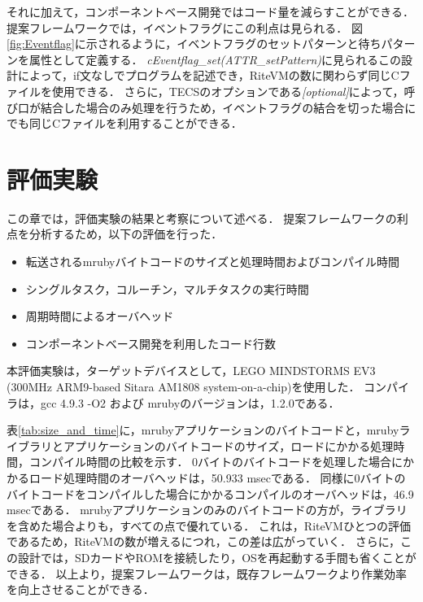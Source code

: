 \documentclass[submit,techrep]{ipsj}
\begin{document}
それに加えて，コンポーネントベース開発ではコード量を減らすことができる．
提案フレームワークでは，イベントフラグにこの利点は見られる．
図\ref{fig:Eventflag}に示されるように，イベントフラグのセットパターンと待ちパターンを属性として定義する．
{\it cEventflag\_set(ATTR\_setPattern)}に見られるこの設計によって，if文なしでプログラムを記述でき，RiteVMの数に関わらず同じCファイルを使用できる．
さらに，TECSのオプションである{\it [optional]}によって，呼び口が結合した場合のみ処理を行うため，イベントフラグの結合を切った場合にでも同じCファイルを利用することができる．

\section{評価実験}
\label{sec:Evaluation}
この章では，評価実験の結果と考察について述べる．
提案フレームワークの利点を分析するため，以下の評価を行った．
\begin{itemize}
    \item 転送されるmrubyバイトコードのサイズと処理時間およびコンパイル時間
    \item シングルタスク，コルーチン，マルチタスクの実行時間
    \item 周期時間によるオーバヘッド
    \item コンポーネントベース開発を利用したコード行数
\end{itemize}

本評価実験は，ターゲットデバイスとして，LEGO MINDSTORMS EV3 (300MHz ARM9-based Sitara AM1808 system-on-a-chip)を使用した．
コンパイラは，gcc 4.9.3 -O2 および mrubyのバージョンは，1.2.0である．

表\ref{tab:size_and_time}に，mrubyアプリケーションのバイトコードと，mrubyライブラリとアプリケーションのバイトコードのサイズ，ロードにかかる処理時間，コンパイル時間の比較を示す．
0バイトのバイトコードを処理した場合にかかるロード処理時間のオーバヘッドは，50.933 msecである．
同様に0バイトのバイトコードをコンパイルした場合にかかるコンパイルのオーバヘッドは，46.9 msecである．
mrubyアプリケーションのみのバイトコードの方が，ライブラリを含めた場合よりも，すべての点で優れている．
これは，RiteVMひとつの評価であるため，RiteVMの数が増えるにつれ，この差は広がっていく．
さらに，この設計では，SDカードやROMを接続したり，OSを再起動する手間も省くことができる．
以上より，提案フレームワークは，既存フレームワークより作業効率を向上させることができる．
\end{document}
